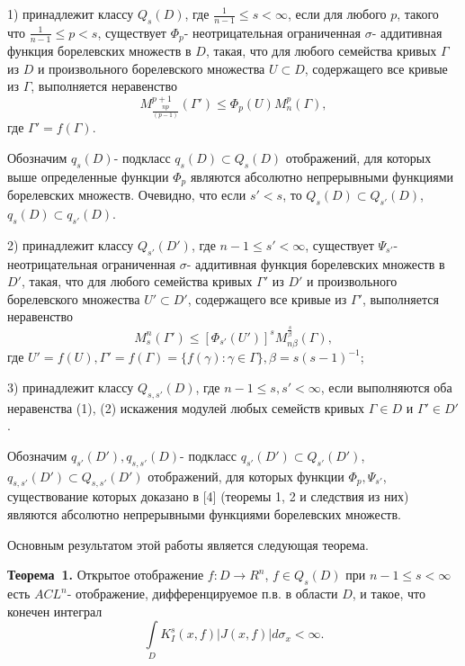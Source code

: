     1) принадлежит классу $Q_{s}(D)$, где $\frac{1}{n-1}\leqslant s<\infty$, если для любого $p$, такого что $\frac{1}{n-1}\leqslant p<s$, существует $\Phi_{p}$- неотрицательная ограниченная $\sigma$- аддитивная функция борелевских множеств в $D$, такая, что для любого семейства кривых $\Gamma$ из $D$ и произвольного борелевского множества $U\subset D$, содержащего все кривые из $\Gamma$, выполняется неравенство
 \begin{equation}\label{eq-1}
 	M_{\frac{np}{(p-1)}}^{p+1}(\Gamma')\leqslant\Phi_{p}(U)M^{p}_{n}(\Gamma),
 \end{equation}
где $\Gamma'=f(\Gamma)$.

Обозначим $q_{s}(D)$- подкласс $q_{s}(D)\subset Q_{s}(D)$ отображений, для которых выше определенные функции $\Phi_{p}$ являются абсолютно непрерывными функциями борелевских множеств. Очевидно, что если $s'<s$, то $Q_{s}(D)\subset Q_{s'}(D)$, $q_{s}(D)\subset q_{s'}(D)$.

2) принадлежит классу $Q_{s'}(D')$, где $n-1\leqslant s'<\infty$, существует $\Psi_{s'}$- неотрицательная ограниченная $\sigma$- аддитивная функция борелевских множеств в $D'$, такая, что для любого семейства кривых $\Gamma'$ из $D'$ и произвольного борелевского множества $U'\subset D'$, содержащего все кривые из $\Gamma'$, выполняется неравенство
\begin{equation}\label{eq-2}
M_{s}^{n}(\Gamma')\leqslant[\Phi_{s'}(U')]^{s}M^{\frac{s}{\beta}}_{n\beta}(\Gamma),
\end{equation}
где $U'=f(U),\Gamma'=f(\Gamma)=\{f(\gamma):\gamma\in\Gamma\},\beta=s(s-1)^{-1}$;

3) принадлежит классу $Q_{s,s'}(D)$, где $n-1\leqslant s,s'<\infty$, если выполняются оба неравенства (1), (2) искажения модулей любых семейств кривых $\Gamma\in D$ и $\Gamma'\in D'$.

Обозначим $q_{s'}(D'),q_{s,s'}(D)$- подкласс $q_{s'}(D')\subset Q_{s'}(D')$, $q_{s,s'}(D')\subset Q_{s,s'}(D')$ отображений, для которых функции $\Phi_{p},\Psi_{s'}$, существование которых доказано в [4] (теоремы 1, 2 и следствия из них) являются абсолютно непрерывными функциями борелевских множеств.

Основным результатом этой работы является следующая теорема.


\textbf{Теорема~1.} Открытое отображение $f:D\rightarrow R^{n}$, $f\in Q_{s}(D)$ при $n-1\leqslant s<\infty$ есть $ACL^{n}$- отображение, дифференцируемое п.в. в области $D$, и такое, что конечен интеграл
\begin{equation*}
\int\limits_{D}K^{s}_{I}(x,f)|J(x,f)|d\sigma_{x}<\infty.
\end{equation*}


